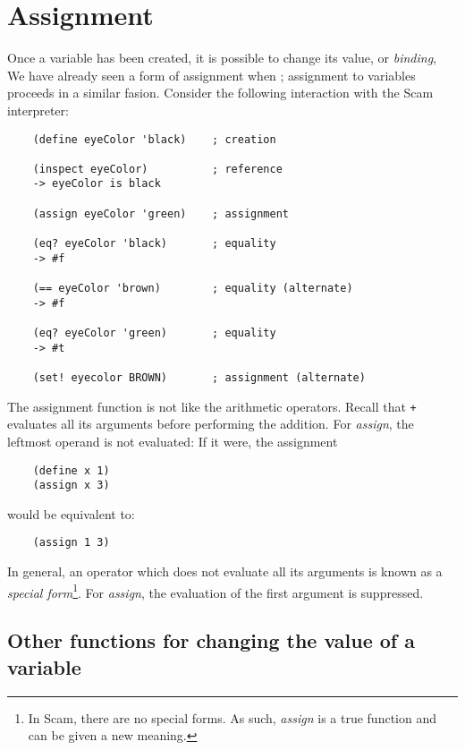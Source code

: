 \chapter{Assignment}
\label{Assignment}

Once a variable has been created, it is possible to change its value,
or {\it binding},
We have already seen a form of assignment when
;
assignment to variables proceeds in a similar fasion.
Consider the following interaction with
the Scam interpreter:

\begin{verbatim}
    (define eyeColor 'black)    ; creation
    
    (inspect eyeColor)          ; reference
    -> eyeColor is black
    
    (assign eyeColor 'green)    ; assignment
    
    (eq? eyeColor 'black)       ; equality
    -> #f
    
    (== eyeColor 'brown)        ; equality (alternate)
    -> #f

    (eq? eyeColor 'green)       ; equality
    -> #t

    (set! eyecolor BROWN)       ; assignment (alternate)
\end{verbatim}

The assignment function is not like the arithmetic operators.
Recall that {\tt +} evaluates all its arguments
before performing the addition.
For {\it assign},
the leftmost operand is not evaluated:
If it were, the assignment

\begin{verbatim}
    (define x 1)
    (assign x 3)
\end{verbatim}
    
would be equivalent to:

\begin{verbatim}
    (assign 1 3)
\end{verbatim}

In general, an operator which does not evaluate
all its arguments is known as a {\it special form}\footnote{
In Scam, there are no special forms. As such, {\it assign} is
a true function and can be given a new meaning.}.
For {\it assign}, the evaluation of the first argument
is suppressed.

\section{Other functions for changing the value of a variable}

